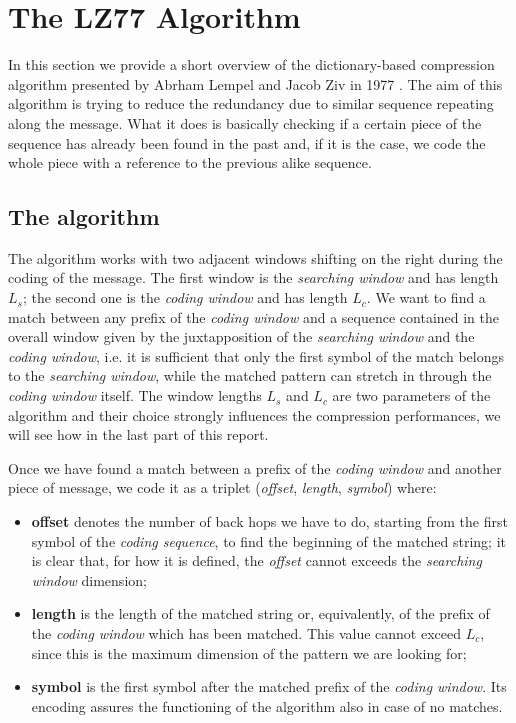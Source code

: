 \section{The LZ77 Algorithm} \label{sec:lz77}
In this section we provide a short overview of the dictionary-based compression algorithm presented by Abrham Lempel and Jacob Ziv in 1977 \cite{ziv1}. The aim of this algorithm is trying to reduce the redundancy due to similar sequence repeating along the message. What it does is basically checking if a certain piece of the sequence has already been found in the past and, if it is the case, we code the whole piece with a reference to the previous alike sequence.

\subsection{The algorithm} \label{subsec:lz77alg}
The algorithm works with two adjacent windows shifting on the right during the coding of the message. The first window is the \textit{searching window} and has length $L_s$; the second one is the \textit{coding window} and has length $L_c$. We want to find a match between any prefix of the \textit{coding window} and a sequence contained in the overall window given by the juxtapposition of the \textit{searching window} and the \textit{coding window}, i.e. it is sufficient that only the first symbol of the match belongs to the \textit{searching window}, while the matched pattern can stretch in through the \textit{coding window} itself. The window lengths $L_s$ and $L_c$ are two parameters of the algorithm and their choice strongly influences the compression performances, we will see how in the last part of this report.
 
Once we have found a match between a prefix of the \textit{coding window} and another piece of message, we code it as a triplet (\textit{offset}, \textit{length}, \textit{symbol}) where:
\begin{itemize}
\item
\textbf{offset} denotes the number of back hops we have to do, starting from the first symbol of the \textit{coding sequence}, to find the beginning of the matched string; it is clear that, for how it is defined, the \textit{offset} cannot exceeds the \textit{searching window} dimension;

\item
\textbf{length} is the length of the matched string or, equivalently, of the prefix of the \textit{coding window} which has been matched. This value cannot exceed $L_c$, since this is the maximum dimension of the pattern we are looking for;

\item
\textbf{symbol} is the first symbol after the matched prefix of the \textit{coding window}. Its encoding assures the functioning of the algorithm also in case of no matches. 
\end{itemize}

